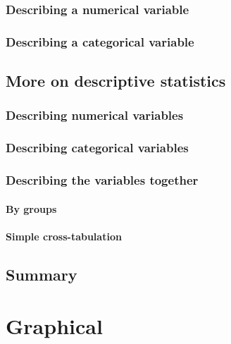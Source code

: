 \documentclass[]{book}
\theoremstyle{definition}
\theoremstyle{definition}
\theoremstyle{definition}
\theoremstyle{remark}
\begin{document}
\subsection{Describing a numerical
variable}\label{describing-a-numerical-variable}

\subsection{Describing a categorical
variable}\label{describing-a-categorical-variable}

\section{More on descriptive
statistics}\label{more-on-descriptive-statistics}

\subsection{Describing numerical
variables}\label{describing-numerical-variables}

\subsection{Describing categorical
variables}\label{describing-categorical-variables}

\subsection{Describing the variables
together}\label{describing-the-variables-together}

\subsubsection{By groups}\label{by-groups}

\subsubsection{Simple cross-tabulation}\label{simple-cross-tabulation}

\section{Summary}\label{summary-1}

\chapter{Graphical}\label{graphical}
\end{document}
